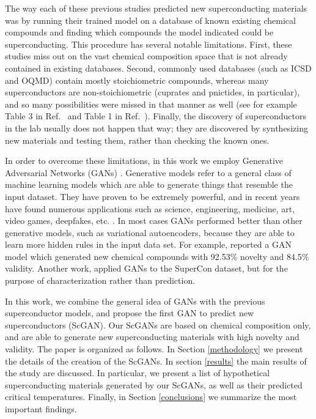 The way each of these previous studies predicted new superconducting materials was by running their trained model on a database of known existing chemical compounds and finding which compounds the model indicated could be superconducting. This procedure has several notable limitations. First, these studies miss out on the vast chemical composition space that is not already contained in existing databases. Second, commonly used databases (such as ICSD and OQMD) contain mostly stoichiometric compounds, whereas many superconductors are non-stoichiometric (cuprates and pnictides, in particular), and so many possibilities were missed in that manner as well (see for example Table 3 in Ref.~\cite{Stanev2018} and Table 1 in Ref.~\cite{ROTER20201353689}). Finally, the discovery of superconductors in the lab usually does not happen that way; they are discovered by synthesizing new materials and testing them, rather than checking the known ones.

In order to overcome these limitations, in this work we employ Generative Adversarial Networks (GANs) \cite{goodfellow2014}. Generative models refer to a general class of machine learning models which are able to generate things that resemble the input dataset. They have proven to be extremely powerful, and in recent years have found numerous applications such as science, engineering, medicine, art, video games, deepfakes, etc. \cite{DBLP:ganreview}. In most cases GANs performed better than other generative models, such as variational autoencoders, because they are able to learn more hidden rules in the input data set. For example, \citeauthor{Dan2020} \cite{Dan2020} reported a GAN model which generated new chemical compounds with 92.53\% novelty and 84.5\% validity. Another work, \citeauthor{sym12111889} \cite{sym12111889} applied GANs to the SuperCon dataset, but for the purpose of characterization rather than prediction. 

In this work, we combine the general idea of GANs with the previous superconductor models, and propose the first GAN to predict new superconductors (ScGAN). Our ScGANs are based on chemical composition only, and are able to generate new superconducting materials with high novelty and validity. The paper is organized as follows. In Section \ref{methodology} we present the details of the creation of the ScGANs. In section \ref{results} the main results of the study are discussed. In particular, we present a list of hypothetical superconducting materials generated by our ScGANs, as well as their predicted critical temperatures. Finally, in Section \ref{conclusions} we summarize the most important findings. 

